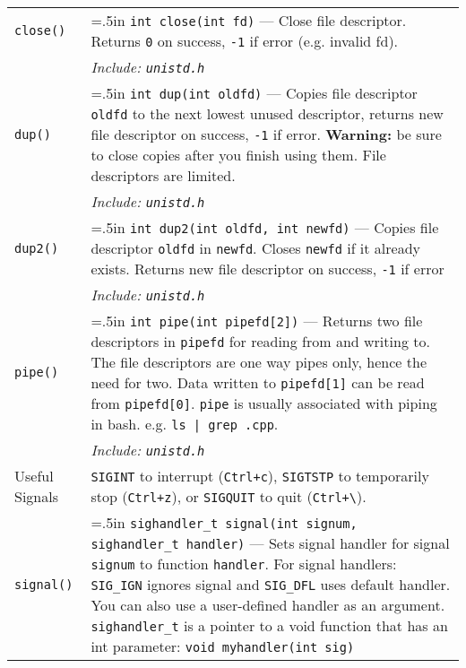 \documentclass{article}
\newcommand{\indenth}[1][.5]{\hangindent=#1in
                         \hangafter=1 }
\begin{document}
\begin{longtabu}{|p{.9in}|p{6.3in}<{\strut}|}
    \texttt{close()} & \indenth\texttt{int close(int fd)} --- Close file descriptor. Returns \texttt{0} on success, \texttt{-1} if error (e.g. invalid fd).
        \\
    & \hspace{.5in}\it Include: \rm\texttt{unistd.h}
        \\ \hline
    \texttt{dup()} & \indenth\texttt{int dup(int oldfd)} --- Copies file descriptor \texttt{oldfd} to the next lowest unused descriptor, returns new file descriptor on success, \texttt{-1} if error.
    \newline\hspace{.5in}\textbf{Warning:} be sure to close copies after you finish using them. File descriptors are limited.
        \\
    & \hspace{.5in}\it Include: \rm\texttt{unistd.h}
        \\
    \texttt{dup2()} & \indenth\texttt{int dup2(int oldfd, int newfd)} --- Copies file descriptor \texttt{oldfd} in \texttt{newfd}. Closes \texttt{newfd} if it already exists. Returns new file descriptor on success, \texttt{-1} if error
        \\
    & \hspace{.5in}\it Include: \rm\texttt{unistd.h}
        \\
    \texttt{pipe()} & \indenth\texttt{int pipe(int pipefd[2])} --- Returns two file descriptors in \texttt{pipefd} for reading from and writing to. The file descriptors are one way pipes only, hence the need for two. Data written to \texttt{pipefd[1]} can be read from \texttt{pipefd[0]}. \texttt{pipe} is usually associated with piping in bash. 
    \newline\hspace{.5in}e.g. \texttt{ls | grep .cpp}. 
        \\
    & \hspace{.5in}\it Include: \rm\texttt{unistd.h}
        \\ \hline
    Useful Signals & \texttt{SIGINT} to interrupt (\texttt{Ctrl+c}), \texttt{SIGTSTP} to temporarily stop (\texttt{Ctrl+z}), or \texttt{SIGQUIT} to quit (\texttt{Ctrl+\textbackslash}). \par
        \\
    \texttt{signal()} & \indenth\texttt{sighandler\_t signal(int signum, sighandler\_t handler)} --- Sets signal handler for signal \texttt{signum} to function \texttt{handler}.  For signal handlers: \texttt{SIG\_IGN} ignores signal and \texttt{SIG\_DFL} uses default handler. You can also use a user-defined handler as an argument. \texttt{sighandler\_t} is a pointer to a void function that has an int parameter: \texttt{void myhandler(int sig)}

\end{longtabu}
\end{document}
